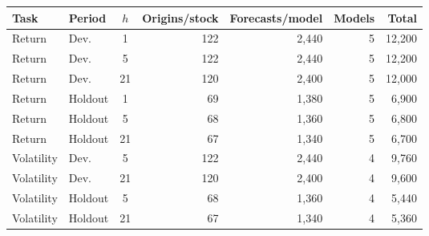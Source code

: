 \begin{tabular}{llcrrrr}
\toprule
Task & Period & $h$ & Origins/stock & Forecasts/model & Models & Total \\
\midrule
Return & Dev. & 1 & 122 & 2,440 & 5 & 12,200 \\
Return & Dev. & 5 & 122 & 2,440 & 5 & 12,200 \\
Return & Dev. & 21 & 120 & 2,400 & 5 & 12,000 \\
Return & Holdout & 1 & 69 & 1,380 & 5 & 6,900 \\
Return & Holdout & 5 & 68 & 1,360 & 5 & 6,800 \\
Return & Holdout & 21 & 67 & 1,340 & 5 & 6,700 \\
Volatility & Dev. & 5 & 122 & 2,440 & 4 & 9,760 \\
Volatility & Dev. & 21 & 120 & 2,400 & 4 & 9,600 \\
Volatility & Holdout & 5 & 68 & 1,360 & 4 & 5,440 \\
Volatility & Holdout & 21 & 67 & 1,340 & 4 & 5,360 \\
\bottomrule
\end{tabular}
